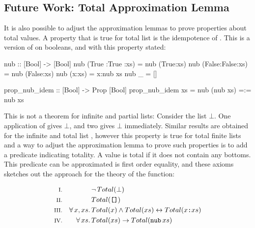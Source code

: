 
\subsection{Future Work: Total Approximation Lemma}
\label{sec:totalapprox}

It is also possible to adjust the approximation lemmas to prove
properties about total values. A property that is true for total list
is the idempotence of . This is a version of  on
booleans, and with this property stated:

\begin{code}
nub :: [Bool] -> [Bool]
nub (True :True :xs) = nub (True:xs)
nub (False:False:xs) = nub (False:xs)
nub (x:xs)           = x:nub xs
nub _                = []

prop_nub_idem :: [Bool] -> Prop [Bool]
prop_nub_idem xs = nub (nub xs) =:= nub xs
\end{code}

\noindent
This is not a theorem for infinite and partial lists: Consider the
list $\bot$. One application of  gives
$\bot$, and two gives $\bot$ immediately. Similar results
are obtained for the infinite and total list , however
this property is true for total finite lists and a way to adjust the
approximation lemma to prove such properties is to add a predicate
indicating totality. A value is total if it does not contain any
bottoms. This predicate can be approximated is first order equality,
and these axioms sketches out the approach for the theory of the
 function:

\begin{align*}
\rom{1} &&             & \neg \, Total(\bot) \\
\rom{2} &&             & Total(\hs{[]}) \\
\rom{3} && \faa{x}{xs} & Total(x) \wedge Total(xs) \leftrightarrow Total(x\hs{:}xs) \\
\rom{4} && \fa{xs}     & Total(xs) \rightarrow Total(\hs{nub} \, xs) \\
\end{align*}

